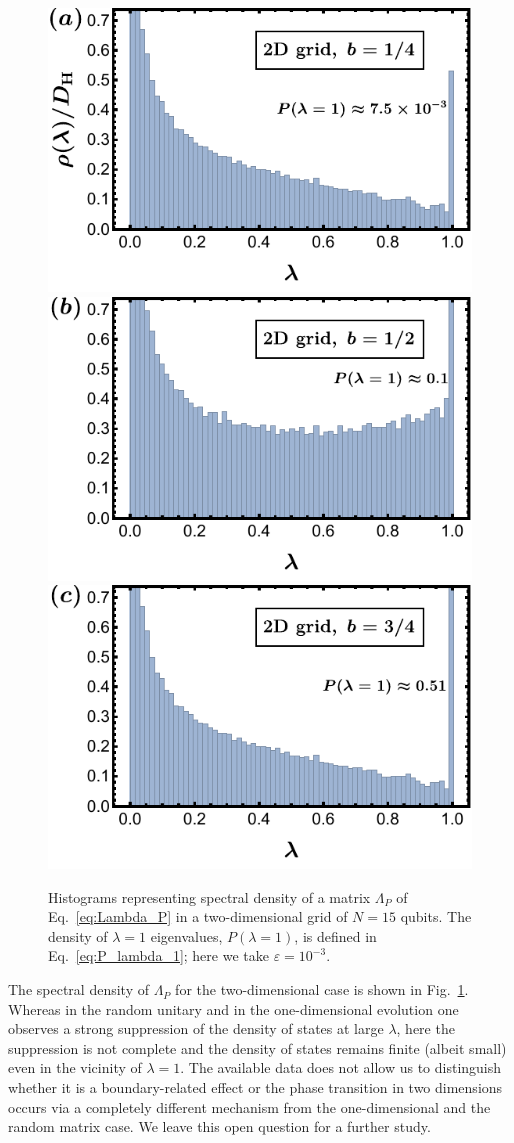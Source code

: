 \documentclass[%
 reprint,
 superscriptaddress,
 amsmath,amssymb,
prx,
]{revtex4-2}\href{\href{}{}}{}
\begin{document}
\begin{figure}
	\includegraphics[width = 0.63\columnwidth]{2D_lam_W_distr_b14.pdf}\qquad
	\includegraphics[width = 0.63\columnwidth]{2D_lam_W_distr_b12.pdf}\qquad
	\includegraphics[width = 0.63\columnwidth]{2D_lam_W_distr_b34.pdf}
	\caption{Histograms representing spectral density of a matrix $\Lambda_P$ of Eq.~\eqref{eq:Lambda_P} in a two-dimensional grid of $N=15$ qubits.
    The density of $\lambda=1$ eigenvalues, $P(\lambda=1)$, is defined in Eq.~\eqref{eq:P_lambda_1}; here we take $\varepsilon=10^{-3}$.
	}
	\label{fig:W_eval_hist_2D}
\end{figure}

The spectral density of $\Lambda_P$ for the two-dimensional case is shown in Fig.~\ref{fig:W_eval_hist_2D}. 
Whereas in the random unitary and in the one-dimensional evolution one observes a strong suppression of the density of states at large $\lambda$, here the suppression is not complete and the density of states remains finite (albeit small) even in the vicinity of $\lambda=1$. The available data does not allow us to distinguish whether it is a boundary-related effect or the phase transition in two dimensions occurs via a completely different mechanism from the one-dimensional and the random matrix case.
We leave this open question for a further study.
\end{document}
